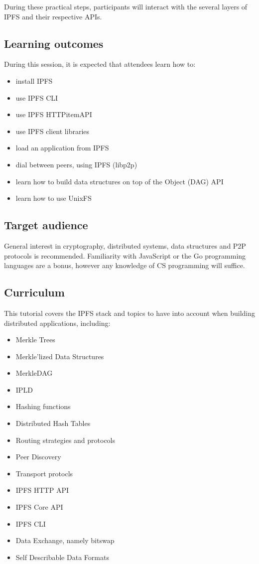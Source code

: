\documentclass[runningheads,a4paper]{llncs}
\begin{document}
During these practical steps, participants will interact with the several layers of IPFS and their respective APIs.

\subsection{Learning outcomes}

During this session, it is expected that attendees learn how to:

\begin{itemize}
  \item install IPFS
  \item use IPFS CLI
  \item use IPFS HTTPitemAPI
  \item use IPFS client libraries
  \item load an application from IPFS
  \item dial between peers, using IPFS (libp2p)
  \item learn how to build data structures on top of the Object (DAG) API
  \item learn how to use UnixFS
\end{itemize}

\subsection{Target audience}

General interest in cryptography, distributed systems, data structures and P2P protocols is recommended. Familiarity with JavaScript or the Go programming languages are a bonus, however any knowledge of CS programming will suffice.

\subsection{Curriculum}

This tutorial covers the IPFS stack and topics to have into account when building distributed applications, including:

\begin{itemize}
  \item Merkle Trees
  \item Merkle'lized Data Structures
  \item MerkleDAG
  \item IPLD
  \item Hashing functions
  \item Distributed Hash Tables
  \item Routing strategies and protocols
  \item Peer Discovery
  \item Transport protocls
  \item IPFS HTTP API
  \item IPFS Core API
  \item IPFS CLI
  \item Data Exchange, namely bitswap
  \item Self Describable Data Formats
\end{itemize}
\end{document}
